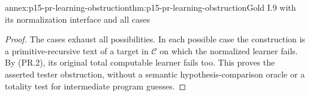 \begin{annexitem}{annex:p15-pr-learning-obstruction}{thm:p15-pr-learning-obstruction}{Gold I.9 with its normalization interface and all cases}
\begin{proof}
The cases exhaust all possibilities. In each
possible case the construction is a primitive-recursive
text of a target in \(\mathcal C\) on which
the normalized learner fails. By (PR.2), its
original total computable learner fails too.
This proves the asserted tester obstruction,
without a semantic hypothesis-comparison oracle
or a totality test for intermediate program guesses.
\end{proof}
\end{annexitem}
